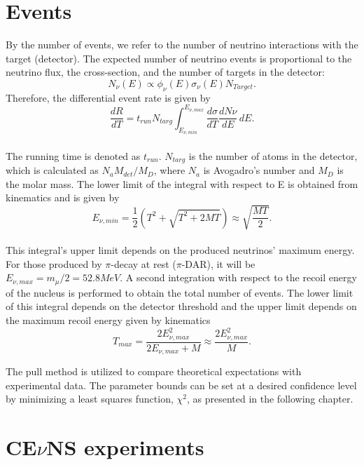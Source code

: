 \section{Events}
By the number of events, we refer to the number of neutrino interactions with the target (detector). The expected number of neutrino events is proportional to the neutrino flux, the cross-section, and the number of targets in the detector:
\\
\begin{equation*}
    N_\nu(E)\propto \phi_\nu(E) \sigma_\nu(E) N_{Target}.
\end{equation*}
Therefore, the differential event rate is given by
\\
\begin{equation}
    \frac{dR}{dT}=t_{run}N_{targ}\int_{E_{\nu,min}}^{E_{\nu,max}} \frac{d\sigma}{dT}\frac{dN\nu}{dE}\,dE.
\end{equation}
\\
The running time is denoted as $t_{run}$. $N_{targ}$ is the number of atoms in the detector, which is calculated as $N_a M_{det}/M_D$, where $N_a$ is Avogadro's number and $M_D$ is the molar mass. The lower limit of the integral with respect to E is obtained from kinematics and is given by \cite{kosmas}
\\
\begin{equation}
    E_{\nu,min}= \frac{1}{2}\left( T^2+\sqrt{T^2+2MT}\right) \approx \sqrt{\frac{MT}{2}}.
\end{equation}
\\
This integral's upper limit depends on the produced neutrinos' maximum energy. For those produced by $\pi$-decay at rest ($\pi$-DAR), it will be $E_{\nu,max}=m_{\mu}/2=52.8 MeV$. A second integration with respect to the recoil energy of the nucleus is performed to obtain the total number of events. The lower limit of this integral depends on the detector threshold and the upper limit depends on the maximum recoil energy given by kinematics
\\
\begin{equation}
    T_{max}=\frac{2 E_{\nu,max}^2}{2 E_{\nu,max}+M} \approx \frac{2 E_{\nu,max}^2}{M}.
\end{equation}

The pull method is utilized to compare theoretical expectations with experimental data. The parameter bounds can be set at a desired confidence level by minimizing a least squares function, $\chi^2$, as presented in the following chapter.
\section{CE$\nu$NS experiments}

